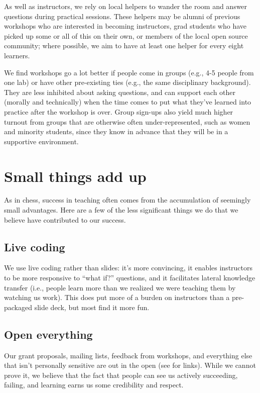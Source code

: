 \documentclass[10pt,a4paper,twocolumn]{article}
\begin{document}
As well as instructors, we rely on local helpers to wander the room
and answer questions during practical sessions. These helpers may be
alumni of previous workshops who are interested in becoming
instructors, grad students who have picked up some or all of this on
their own, or members of the local open source community; where
possible, we aim to have at least one helper for every eight learners.

We find workshops go a lot better if people come in groups (e.g., 4-5
people from one lab) or have other pre-existing ties (e.g., the same
disciplinary background). They are less inhibited about asking
questions, and can support each other (morally and technically) when
the time comes to put what they've learned into practice after the
workshop is over. Group sign-ups also yield much higher turnout from
groups that are otherwise often under-represented, such as women and
minority students, since they know in advance that they will be in a
supportive environment.

\section*{Small things add up}

As in chess, success in teaching often comes from the accumulation of
seemingly small advantages. Here are a few of the less significant
things we do that we believe have contributed to our success.

\subsection*{Live coding}

We use live coding rather than slides: it's more convincing, it enables
instructors to be more responsive to ``what if?'' questions, and it
facilitates lateral knowledge transfer (i.e., people learn more than we
realized we were teaching them by watching us work). This does put more
of a burden on instructors than a pre-packaged slide deck, but most find
it more fun.

\subsection*{Open everything}

Our grant proposals, mailing lists, feedback from workshops, and
everything else that isn't personally sensitive are out in the open
(see \cite{swcsite} for links).  While we cannot prove it, we believe
that the fact that people can see us actively succeeding, failing, and
learning earns us some credibility and respect.
\end{document}

